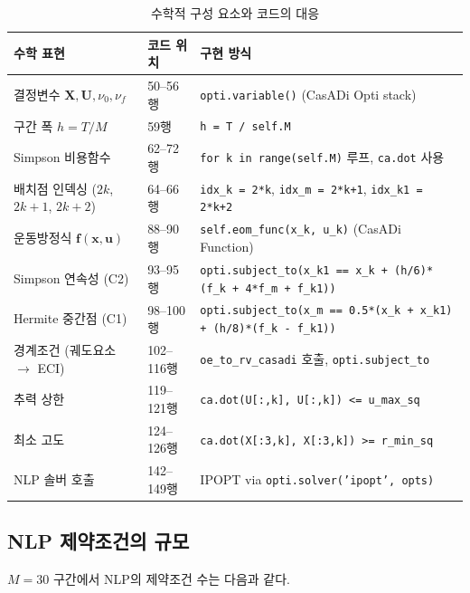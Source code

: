 \documentclass[11pt]{article}
\begin{document}
\begin{table}[htbp]
\centering
\caption{수학적 구성 요소와 코드의 대응}
\label{tab:code-mapping}
\begin{tabular}{@{}lll@{}}
\toprule
수학 표현 & 코드 위치 & 구현 방식 \\
\midrule
결정변수 $\mathbf{X}, \mathbf{U}, \nu_0, \nu_f$ & 50--56행 & \texttt{opti.variable()} (CasADi Opti stack) \\
구간 폭 $h = T/M$ & 59행 & \texttt{h = T / self.M} \\
Simpson 비용함수 & 62--72행 & \texttt{for k in range(self.M)} 루프, \texttt{ca.dot} 사용 \\
배치점 인덱싱 ($2k$, $2k\!+\!1$, $2k\!+\!2$) & 64--66행 & \texttt{idx\_k = 2*k}, \texttt{idx\_m = 2*k+1}, \texttt{idx\_k1 = 2*k+2} \\
운동방정식 $\mathbf{f}(\mathbf{x}, \mathbf{u})$ & 88--90행 & \texttt{self.eom\_func(x\_k, u\_k)} (CasADi Function) \\
Simpson 연속성 (C2) & 93--95행 & \texttt{opti.subject\_to(x\_k1 == x\_k + (h/6)*(f\_k + 4*f\_m + f\_k1))} \\
Hermite 중간점 (C1) & 98--100행 & \texttt{opti.subject\_to(x\_m == 0.5*(x\_k + x\_k1) + (h/8)*(f\_k - f\_k1))} \\
경계조건 (궤도요소 $\to$ ECI) & 102--116행 & \texttt{oe\_to\_rv\_casadi} 호출, \texttt{opti.subject\_to} \\
추력 상한 & 119--121행 & \texttt{ca.dot(U[:,k], U[:,k]) <= u\_max\_sq} \\
최소 고도 & 124--126행 & \texttt{ca.dot(X[:3,k], X[:3,k]) >= r\_min\_sq} \\
NLP 솔버 호출 & 142--149행 & IPOPT via \texttt{opti.solver('ipopt', opts)} \\
\bottomrule
\end{tabular}
\end{table}


\subsection{NLP 제약조건의 규모}
\label{sec:nlp-scale}

$M = 30$ 구간에서 NLP의 제약조건 수는 다음과 같다.
\end{document}
